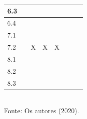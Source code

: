 \begin{table}[!htb]
\begin{tabular}{|p{4cm}|p{2.21cm}|p{2.21cm}|p{2.21cm}|p{2.45cm}|c|c|c|}
    \hline 6.3  &       &       &       &       \\
    \hline 6.4  &       &       &       &       \\
    \hline 7.1  &       &       &       &       \\
    \hline 7.2  &       & X     & X     & X     \\
    \hline 8.1  &       &       &       &       \\
    \hline 8.2  &       &       &       &       \\
    \hline 8.3  &       &       &       &       \\
    \hline
    \end{tabular} 
    \\
    Fonte: Os autores (2020).
\end{table}

